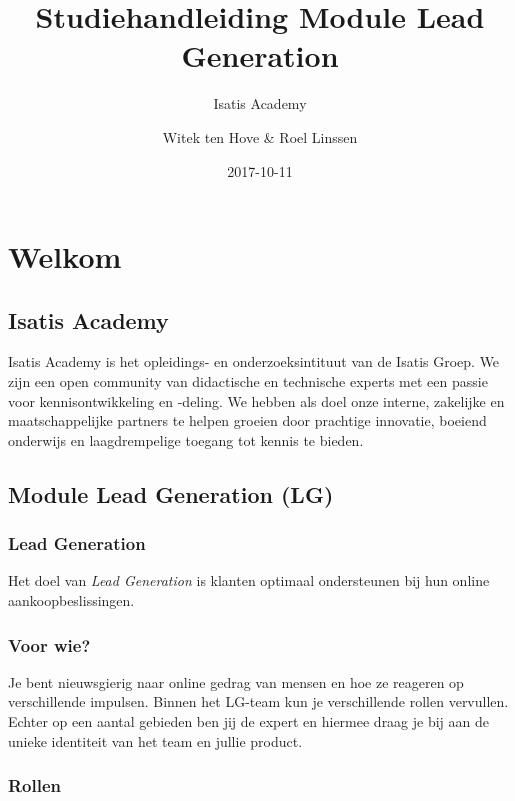 \documentclass[]{book}
\title{Studiehandleiding Module Lead Generation}
\subtitle{Isatis Academy}
\author{Witek ten Hove \& Roel Linssen}
\date{2017-10-11}
\begin{document}
\maketitle

{
\setcounter{tocdepth}{1}
\tableofcontents
}
\chapter{Welkom}\label{welkom}

\section{Isatis Academy}\label{isatis-academy}

Isatis Academy is het opleidings- en onderzoeksintituut van de Isatis
Groep. We zijn een open community van didactische en technische experts
met een passie voor kennisontwikkeling en -deling. We hebben als doel
onze interne, zakelijke en maatschappelijke partners te helpen groeien
door prachtige innovatie, boeiend onderwijs en laagdrempelige toegang
tot kennis te bieden.

\section{Module Lead Generation (LG)}\label{module-lead-generation-lg}

\subsection{Lead Generation}\label{lead-generation}

Het doel van \emph{Lead Generation} is klanten optimaal ondersteunen bij
hun online aankoopbeslissingen.

\subsection{Voor wie?}\label{voor-wie}

Je bent nieuwsgierig naar online gedrag van mensen en hoe ze reageren op
verschillende impulsen. Binnen het LG-team kun je verschillende rollen
vervullen. Echter op een aantal gebieden ben jij de expert en hiermee
draag je bij aan de unieke identiteit van het team en jullie product.

\subsection{Rollen}\label{rollen}
\end{document}
